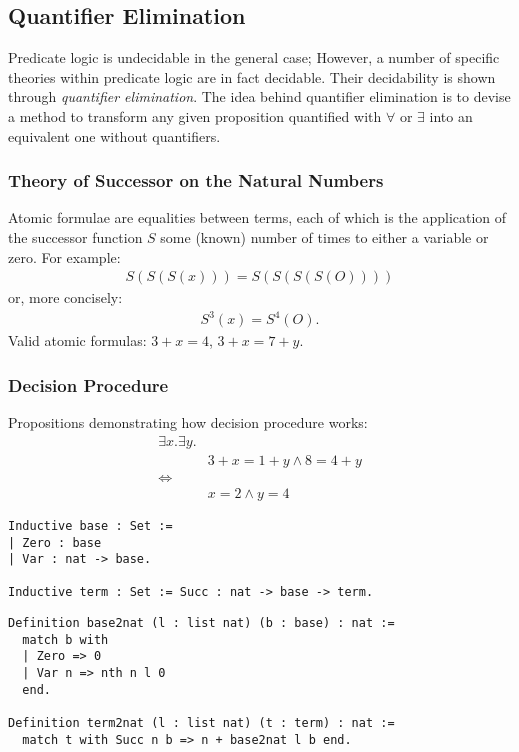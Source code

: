 \documentclass{beamer}
\begin{document}
\begin{frame}\justifying
  \section{Quantifier Elimination}
  Predicate logic is undecidable in the general case; However, a number of specific theories within predicate logic are in fact decidable. Their decidability is shown through \textit{quantifier elimination}. The idea behind quantifier elimination is to devise a method to transform any given proposition quantified with $\forall$ or $\exists$ into an equivalent one without quantifiers.
\end{frame}

\begin{frame}\justifying
  \frametitle{Theory of Successor on the Natural Numbers}
  Atomic formulae are equalities between terms, each of which is the application of the successor function $S$ some (known) number of times to either a variable or zero. For example:
  \begin{align*}
    S(S(S(x))) = S(S(S(S(O))))
  \end{align*}
  or, more concisely:
  \begin{align*}
    S^3(x) = S^4(O).
  \end{align*}
  Valid atomic formulas: $3 + x = 4$, $3 + x = 7 + y$.
\end{frame}

\begin{frame}
  \frametitle{Decision Procedure}
  Propositions demonstrating how decision procedure works:
  \begin{align*}
    \exists x. \exists y. &
    \\
    & 3 + x = 1 + y \land 8 = 4 + y
    \\
    \iff &
    \\
    & x = 2 \land y = 4
  \end{align*}
\end{frame}

\begin{frame}[fragile]
\begin{verbatim}
Inductive base : Set :=
| Zero : base
| Var : nat -> base.

Inductive term : Set := Succ : nat -> base -> term.
\end{verbatim}

\begin{verbatim}
Definition base2nat (l : list nat) (b : base) : nat :=
  match b with
  | Zero => 0
  | Var n => nth n l 0
  end.

Definition term2nat (l : list nat) (t : term) : nat :=
  match t with Succ n b => n + base2nat l b end.
\end{verbatim}
\end{frame}
\end{document}

